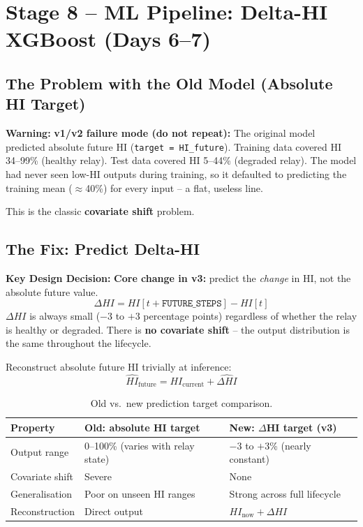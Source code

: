 \documentclass[12pt,a4paper]{article}
\newenvironment{warnbox}{%
  \begin{mdframed}[backgroundcolor=warnbg,linecolor=warnln,linewidth=1.5pt,
    innerleftmargin=9pt,innerrightmargin=9pt,innertopmargin=5pt,innerbottommargin=5pt]
  \textbf{\color{warnln}Warning: }}{\end{mdframed}}
\newenvironment{fixbox}{%
  \begin{mdframed}[backgroundcolor=fixbg,linecolor=fixln,linewidth=2pt,
    innerleftmargin=9pt,innerrightmargin=9pt,innertopmargin=6pt,innerbottommargin=6pt]
  \textbf{\color{fixln}Key Design Decision: }}{\end{mdframed}}
\begin{document}
\section{Stage 8 -- ML Pipeline: Delta-HI XGBoost (Days 6--7)}

\subsection{The Problem with the Old Model (Absolute HI Target)}

\begin{warnbox}
\textbf{v1/v2 failure mode (do not repeat):} The original model predicted absolute future HI
(\texttt{target = HI\_future}). Training data covered HI 34--99\% (healthy relay). Test data covered
HI 5--44\% (degraded relay). The model had never seen low-HI outputs during training, so it defaulted to
predicting the training mean ($\approx$40\%) for every input -- a flat, useless line.

This is the classic \textbf{covariate shift} problem.
\end{warnbox}

\subsection{The Fix: Predict Delta-HI}

\begin{fixbox}
\textbf{Core change in v3:} predict the \textit{change} in HI, not the absolute future value.
\[
\Delta HI = HI[t + \texttt{FUTURE\_STEPS}] - HI[t]
\]
$\Delta HI$ is always small ($-3$ to $+3$ percentage points) regardless of whether the relay is healthy or
degraded. There is \textbf{no covariate shift} -- the output distribution is the same throughout the lifecycle.

Reconstruct absolute future HI trivially at inference:
\[
\widehat{HI}_{\text{future}} = HI_{\text{current}} + \widehat{\Delta HI}
\]
\end{fixbox}

\begin{table}[H]
\centering
\begin{tabularx}{\textwidth}{lXX}
\toprule
\textbf{Property} & \textbf{Old: absolute HI target} & \textbf{New: $\Delta$HI target (v3)} \\
\midrule
Output range    & 0--100\% (varies with relay state)  & $-3$ to $+3$\% (nearly constant) \\
Covariate shift & Severe                              & None \\
Generalisation  & Poor on unseen HI ranges            & Strong across full lifecycle \\
Reconstruction  & Direct output                       & $HI_{\text{now}} + \Delta HI$ \\
\bottomrule
\end{tabularx}
\caption{Old vs.\ new prediction target comparison.}
\end{table}
\end{document}
